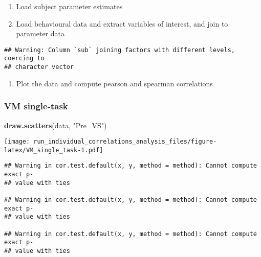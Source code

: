 \documentclass[]{article}
\newenvironment{Shaded}{\begin{snugshade}}{\end{snugshade}}
\newcommand{\KeywordTok}[1]{\textcolor[rgb]{0.13,0.29,0.53}{\textbf{#1}}}
\newcommand{\DataTypeTok}[1]{\textcolor[rgb]{0.13,0.29,0.53}{#1}}
\newcommand{\StringTok}[1]{\textcolor[rgb]{0.31,0.60,0.02}{#1}}
\newcommand{\OperatorTok}[1]{\textcolor[rgb]{0.81,0.36,0.00}{\textbf{#1}}}
\newcommand{\NormalTok}[1]{#1}
\providecommand{\tightlist}{%
  \setlength{\itemsep}{0pt}\setlength{\parskip}{0pt}}
\begin{document}
\begin{enumerate}
\def\labelenumi{\arabic{enumi}.}
\item
  Load subject parameter estimates
\item
  Load behavioural data and extract variables of interest, and join to
  parameter data
\end{enumerate}

\begin{verbatim}
## Warning: Column `sub` joining factors with different levels, coercing to
## character vector
\end{verbatim}

\begin{enumerate}
\def\labelenumi{\arabic{enumi}.}
\setcounter{enumi}{2}
\tightlist
\item
  Plot the data and compute pearson and spearman correlations
\end{enumerate}

\subsubsection{VM single-task}\label{vm-single-task}

\begin{Shaded}
\begin{Highlighting}[]
\KeywordTok{draw.scatters}\NormalTok{(data, }\StringTok{"Pre_VS"}\NormalTok{)}
\end{Highlighting}
\end{Shaded}

\texttt{[image: run\_individual\_correlations\_analysis\_files/figure-latex/VM\_single\_task-1.pdf]}

\begin{Shaded}
\end{Shaded}

\begin{verbatim}
## Warning in cor.test.default(x, y, method = method): Cannot compute exact p-
## value with ties

## Warning in cor.test.default(x, y, method = method): Cannot compute exact p-
## value with ties

## Warning in cor.test.default(x, y, method = method): Cannot compute exact p-
## value with ties
\end{verbatim}
\end{document}
